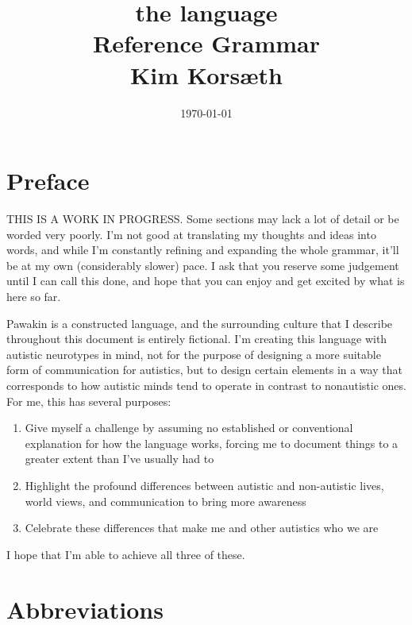 \documentclass[smallroyalvopaper,9pt]{memoir} %
\title{
    \fontsize{50}{40}\selectfont 
    {the \langeng{} language} \\
    \sffamily 
    \vspace{2cm}
    \fontsize{30}{32}\selectfont 
    Reference Grammar\\
    \vspace{2cm}
    Kim Korsæth
}
\author{}
\date{\today}
\newcommand{\langeng}{Pawakin}
\begin{document}
\maketitle

\newpage

\frontmatter

\chapter*{Preface}

THIS IS A WORK IN PROGRESS. Some sections may lack a lot of detail or be worded very poorly. I'm not good at translating my thoughts and ideas into words, and while I'm constantly refining and expanding the whole grammar, it'll be at my own (considerably slower) pace. I ask that you reserve some judgement until I can call this done, and hope that you can enjoy and get excited by what is here so far.

\langeng{} is a constructed language, and the surrounding culture that I describe throughout this document is entirely fictional. I'm creating this language with autistic neurotypes in mind, not for the purpose of designing a more suitable form of communication for autistics, but to design certain elements in a way that corresponds to how autistic minds tend to operate in contrast to nonautistic ones. For me, this has several purposes: 

\begin{enumerate}
    \item Give myself a challenge by assuming no established or conventional explanation for how the language works, forcing me to document things to a greater extent than I've usually had to
    \item Highlight the profound differences between autistic and non-autistic lives, world views, and communication to bring more awareness
    \item Celebrate these differences that make me and other autistics who we are
\end{enumerate}

I hope that I'm able to achieve all three of these. 

\newpage
\tableofcontents
\listoffigures
\listoftables
\newpage

\chapter{Abbreviations}
\end{document}
